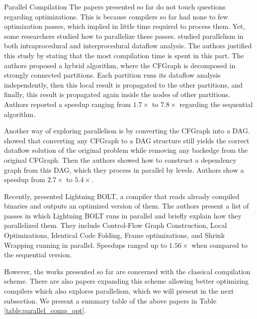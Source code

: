 \begin{section}{Parallel Compilation}
The papers presented so far do not touch questions regarding optimizations.
This is because compilers so far had none to few optimization passes, which
implied in little time required to process them. Yet, some researchers studied
how to parallelize these passes. \cite{Lee1994} studied parallelism in both
intraprocedural and interprocedural dataflow analysis. The authors justified this
study by stating that the most compilation time is spent in this part. The
authors proposed a hybrid algorithm, where the CFGraph is decomposed in
strongly connected partitions. Each partition runs its dataflow analysis
independently, then this local result is propagated to the other partitions,
and finally, this result is propagated again inside the nodes of other
partitions. Authors reported a speedup ranging from $1.7\times$ to $7.8\times$
regarding the sequential algorithm.

Another way of exploring parallelism is by converting the CFGraph into a DAG.
\cite{kramer1994combining} showed that converting any CFGraph to a DAG
structure still yields the correct dataflow solution of the original problem
while removing any backedge from the original CFGraph. Then the authors showed
how to construct a dependency graph from this DAG, which they process in
parallel by levels. Authors show a speedup from $2.7\times$ to $5.4\times$.


Recently, \cite{panchenko2021lightning} presented
Lightning BOLT, a compiler that reads already compiled binaries and outputs an
optimized version of them. The authors present a list of passes in which
Lightning BOLT runs in parallel and briefly explain how they parallelized them.
They include Control-Flow Graph Construction, Local Optimizations, Identical
Code Folding, Frame optimizations, and Shrink Wrapping running in parallel.
Speedups ranged up to $1.56\times$ when compared to the sequential version.

However, the works presented so far are concerned with the classical
compilation scheme. There are also papers expanding this scheme allowing better
optimizing compilers which also explores parallelism, which we will present in
the next subsection. We present a summary table of the above papers in
Table \ref{table:parallel_comp_opt}.


\end{section}
